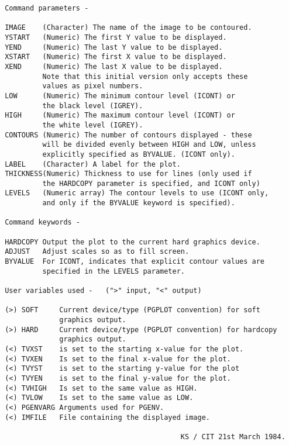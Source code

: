 \begin{description}
\begin{verbatim}
 Command parameters -

 IMAGE    (Character) The name of the image to be contoured.
 YSTART   (Numeric) The first Y value to be displayed.
 YEND     (Numeric) The last Y value to be displayed.
 XSTART   (Numeric) The first X value to be displayed.
 XEND     (Numeric) The last X value to be displayed.
          Note that this initial version only accepts these
          values as pixel numbers.
 LOW      (Numeric) The minimum contour level (ICONT) or
          the black level (IGREY).
 HIGH     (Numeric) The maximum contour level (ICONT) or
          the white level (IGREY).
 CONTOURS (Numeric) The number of contours displayed - these
          will be divided evenly between HIGH and LOW, unless
          explicitly specified as BYVALUE. (ICONT only).
 LABEL    (Character) A label for the plot.
 THICKNESS(Numeric) Thickness to use for lines (only used if
          the HARDCOPY parameter is specified, and ICONT only)
 LEVELS   (Numeric array) The contour levels to use (ICONT only,
          and only if the BYVALUE keyword is specified).

 Command keywords -

 HARDCOPY Output the plot to the current hard graphics device.
 ADJUST   Adjust scales so as to fill screen.
 BYVALUE  For ICONT, indicates that explicit contour values are
          specified in the LEVELS parameter.

 User variables used -   (">" input, "<" output)

 (>) SOFT     Current device/type (PGPLOT convention) for soft
              graphics output.
 (>) HARD     Current device/type (PGPLOT convention) for hardcopy
              graphics output.
 (<) TVXST    is set to the starting x-value for the plot.
 (<) TVXEN    Is set to the final x-value for the plot.
 (<) TVYST    is set to the starting y-value for the plot
 (<) TVYEN    is set to the final y-value for the plot.
 (<) TVHIGH   Is set to the same value as HIGH.
 (<) TVLOW    Is set to the same value as LOW.
 (<) PGENVARG Arguments used for PGENV.
 (<) IMFILE   File containing the displayed image.

                                           KS / CIT 21st March 1984.
\end{verbatim}
\end{description}
